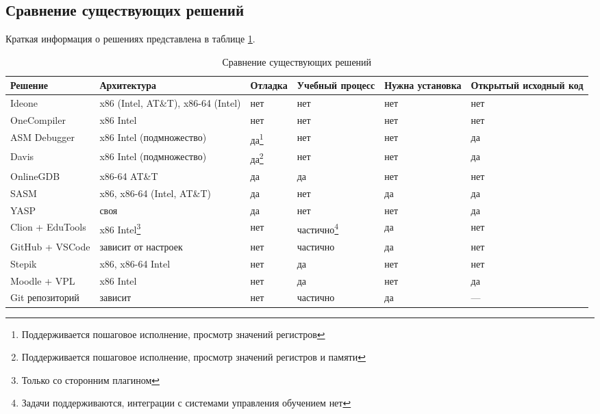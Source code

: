 \documentclass[a4paper,article,14pt]{extarticle}
\begin{document}
\subsection{Сравнение существующих решений}

Краткая информация о решениях представлена в таблице \ref{table:alternatives}.

\begin{center}
\small
    \begin{longtable}{|p{3.1cm}|p{2.4cm}|p{2cm}|p{2cm}|p{2cm}|p{2cm}|}
    \caption{Сравнение существующих решений}\label{table:alternatives} \\
    \hline
    \textbf{Решение} & \textbf{Архитектура} & \textbf{Отладка} & \textbf{Учебный процесс} & \textbf{Нужна установка} & \textbf{Открытый исходный код} \\
    \hline
    Ideone & x86 (Intel, AT\&T), x86-64 (Intel) & нет & нет & нет & нет \\ \hline
    OneCompiler & x86 Intel & нет & нет & нет & нет \\ \hline
    ASM Debugger & x86 Intel (подмножество) & да\footnote{Поддерживается пошаговое исполнение, просмотр значений регистров} & нет & нет & да \\ \hline
    Davis & x86 Intel (подмножество) & да\footnote{Поддерживается пошаговое исполнение, просмотр значений регистров и памяти} & нет & нет & да \\ \hline
    OnlineGDB & x86-64 AT\&T & да & да & нет & нет \\ \hline
    SASM & x86, x86-64 (Intel, AT\&T) & да & нет & да & да \\ \hline
    YASP & своя & да & нет & нет & да \\ \hline
    Clion + EduTools & x86 Intel\footnote{Только со сторонним плагином} & нет & частично\footnote{Задачи поддерживаются, интеграции с системами управления обучением нет} & да & нет \\ \hline
    GitHub + VSCode & зависит от настроек & нет & частично & да & нет \\ \hline
    Stepik & x86, x86-64 Intel & нет & да & нет & нет \\ \hline
    Moodle + VPL & x86 Intel & нет & да & нет & да \\ \hline
    Git репозиторий & зависит & нет & частично & да & --- \\ \hline
    \end{longtable}
\normalsize
\end{center}
\end{document}
